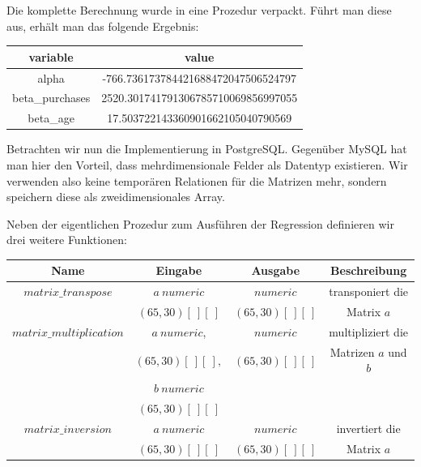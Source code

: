 Die komplette Berechnung wurde in eine Prozedur verpackt. Führt man diese aus, erhält man das folgende Ergebnis:

\begin{center}
  \begin{tabular}{|c|c|}\hline
    \textbf{variable} & \textbf{value} \\ \hline
    alpha & -766.736173784421688472047506524797 \\ \hline
    beta\_purchases & 2520.301741791306785710069856997055 \\ \hline
    beta\_age & 17.503722143360901662105040790569 \\ \hline
  \end{tabular}
\end{center}

Betrachten wir nun die Implementierung in PostgreSQL. Gegenüber MySQL hat man hier den Vorteil, dass mehrdimensionale Felder als Datentyp existieren. Wir verwenden also keine temporären Relationen für die Matrizen mehr, sondern speichern diese als zweidimensionales Array.

Neben der eigentlichen Prozedur zum Ausführen der Regression definieren wir drei weitere Funktionen:
\begin{center}
  \begin{tabular}{|c|c|c|c|}\hline
    \textbf{Name} & \textbf{Eingabe} & \textbf{Ausgabe} & \textbf{Beschreibung} \\ \hline
    $matrix\_transpose$ & $a ~ numeric$ & $numeric$ & transponiert die \\
     & $(65, 30)[~][~]$ & $(65, 30)[~][~]$ & Matrix $a$ \\ \hline
    $matrix\_multiplication$ & $a ~ numeric$, & $numeric$ & multipliziert die \\
     & $(65, 30)[~][~],$ & $(65, 30)[~][~]$ & Matrizen $a$ und $b$ \\
     & $b ~ numeric$ & & \\
     & $(65, 30)[~][~]$ & & \\ \hline
    $matrix\_inversion$ & $a ~ numeric$ & $numeric$ & invertiert die \\
     & $(65, 30)[~][~]$ & $(65, 30)[~][~]$ & Matrix $a$ \\ \hline
  \end{tabular}
\end{center}


